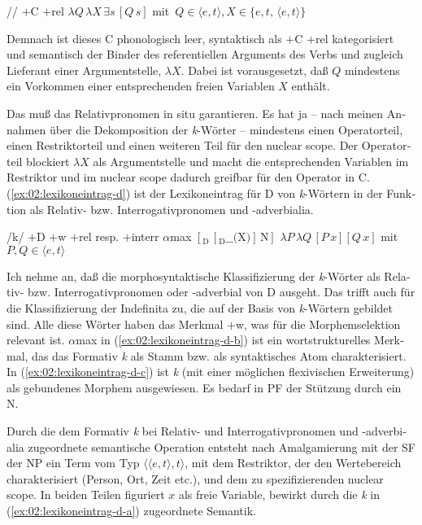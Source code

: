 \documentclass[output=paper, colorlinks, citecolor=brown, booklanguage=german]{langscibook}
\begin{document}
\begin{otherlanguage}{german}
\newpage
\ea\label{ex:02:lexikoneintrag-c}
    \ea /\varnothing/
    \ex $+$C $+$rel
    \ex $\lambda Q\, \lambda X\, \exists s\, [Q\, s]$ mit\, $Q \in \langle e,t\rangle, X \in \{e, t,\, \langle e,t\rangle \}$
    \z
\z 

\noindent Demnach ist dieses C phonologisch leer, syntaktisch als $+$C $+$rel kategorisiert und semantisch der Binder des referentiellen Arguments des Verbs und zugleich Lieferant einer Argumentstelle, $\lambda X$. Dabei ist vorausgesetzt, daß $Q$ mindestens ein Vorkommen einer entsprechenden freien Variablen $X$ enthält. 

Das muß das Relativpronomen in situ garantieren. Es hat ja -- nach meinen Annahmen über die Dekomposition der \textit{k}-Wörter -- mindestens einen Operatorteil, einen Restriktorteil und einen weiteren Teil für den nuclear scope. Der Operatorteil blockiert $\lambda X$ als Argumentstelle und macht die entsprechenden Variablen im Restriktor und im nuclear scope dadurch greifbar für den Operator in C. (\ref{ex:02:lexikoneintrag-d}) ist der Lexikoneintrag für D von \textit{k}-Wörtern in der Funktion als Relativ- bzw. Interrogativpronomen und -ad\-verbia\-lia.

\ea\label{ex:02:lexikoneintrag-d}
    \ea\label{ex:02:lexikoneintrag-d-a} /k/
    \ex\label{ex:02:lexikoneintrag-d-b} $+$D $+$w $+$rel resp. $+$interr $\alpha$max
    \ex\label{ex:02:lexikoneintrag-d-c} $[_\textrm{D}\, [_\textrm{D} \_\_ \textrm{(X)} ]\, \textrm{N} ]$
    \ex\label{ex:02:lexikoneintrag-d-d} $\lambda P\, \lambda Q\, [ P\, x ][ Q\, x ]$ mit $P, Q \in \langle e, t\rangle$
    \z
\z

\noindent Ich nehme an, daß die morphosyntaktische Klassifizierung der \textit{k}-Wörter als Re\-la\-tiv- bzw. Interrogativpronomen oder -adverbial von D ausgeht. Das trifft auch für die Klassifizierung der Indefinita zu, die auf der Basis von \textit{k}-Wörtern gebildet sind. Alle diese Wörter haben das Merkmal $+$w, was für die Morphemselektion relevant ist. $\alpha$max in (\ref{ex:02:lexikoneintrag-d-b}) ist ein wortstrukturelles Merkmal, das das Formativ \textit{k} als Stamm bzw. als syntaktisches Atom charakterisiert. In (\ref{ex:02:lexikoneintrag-d-c}) ist \textit{k} (mit einer möglichen flexivischen Erweiterung) als gebundenes Morphem ausgewiesen. Es bedarf in  PF der Stützung durch ein N.

Durch die dem Formativ \textit{k} bei Relativ- und Interrogativpronomen und -ad\-verbialia zugeordnete semantische Operation entsteht nach Amalgamierung mit der SF der NP ein Term vom Typ $\langle\langle e, t\rangle, t\rangle$, mit dem Restriktor, der den Wer\-te\-be\-reich charakterisiert (Person, Ort, Zeit etc.), und dem zu spezifizierenden nuclear scope. In beiden Teilen figuriert $x$ als freie Variable, bewirkt durch die \textit{k} in (\ref{ex:02:lexikoneintrag-d-a}) zugeordnete Semantik.


\end{otherlanguage}
\end{document}
